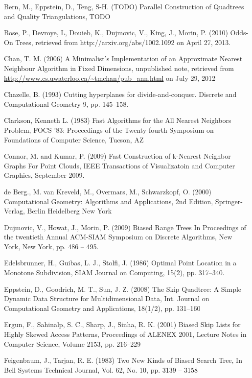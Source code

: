\documentclass[mcs]{scsthesis}
\begin{document}
\begin{thebibliography}{5}
Bern, M., Eppstein, D., Teng, S-H. (TODO) Parallel Construction of Quadtrees and
Quality Triangulations, TODO

Bose, P., Devroye, L, Douieb, K., Dujmovic, V., King, J., Morin, P. (2010)
Odds-On Trees, retrieved from http://arxiv.org/abs/1002.1092 on April 27, 2013.

Chan, T. M. (2006) A Minimalist's Implementation of an Approximate Nearest
Neighbour Algorithm in Fixed Dimensions, unpublished note, retrieved from
\url{http://www.cs.uwaterloo.ca/~tmchan/pub\_ann.html} on July 29, 2012

 Chazelle, B. (1993) Cutting hyperplanes for divide-and-conquer.
Discrete and Computational Geometry 9, pp. 145--158.

Clarkson, Kenneth L. (1983) Fast Algorithms for the All Nearest Neighbors Problem,
FOCS '83: Proceedings of the Twenty-fourth Symposium on Foundations of Computer Science,
Tucson, AZ 

Connor, M. and Kumar, P. (2009) Fast Construction of k-Nearest Neighbor Graphs
For Point Clouds, IEEE Transactions of Visualizatoin and Computer Graphics,
September 2009.

de Berg., M. van Kreveld, M., Overmars, M., Schwarzkopf, O. (2000)
Computational Geometry: Algorithms and Applications, 2nd Edition, Springer-Verlag,
Berlin Heidelberg New York

Dujmovic, V., Howat, J., Morin, P. (2009) Biased Range Trees
In Proceedings of the twentieth Annual ACM-SIAM Symposium on Discrete Algorithms,
New York, New York, pp. 486 -- 495.

Edelsbrunner, H., Guibas, L. J., Stolfi, J. (1986) Optimal Point Location in a
Monotone Subdivision, SIAM Journal on Computing, 15(2), pp. 317--340. 

Eppstein, D., Goodrich, M. T., Sun, J. Z. (2008) The Skip Quadtree: A Simple
Dynamic Data Structure for Multidimensional Data, Int. Journal on Computational
Geometry and Applications, 18(1/2), pp. 131--160 

Ergun, F., Sahinalp, S. C., Sharp, J., Sinha, R. K. (2001) Biased Skip Lists
for Highly Skewed Access Patterns, Proceedings of ALENEX 2001, Lecture Notes in
Computer Science, Volume 2153, pp. 216--229 

Feigenbaum, J., Tarjan, R. E. (1983) Two New Kinds of Biased Search Tree,
In Bell Systems Technical Journal, Vol. 62, No. 10, pp. 3139 -- 3158


\end{thebibliography}
\end{document}

